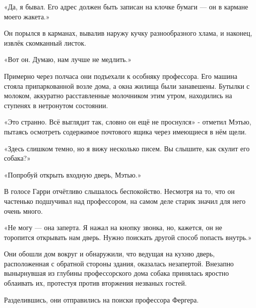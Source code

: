 \documentclass[a4paper,12pt]{book}
\begin{document}
\par
«Да, я бывал. Его адрес должен быть записан на клочке бумаги — он в кармане моего жакета.»
\par
Он порылся в карманах, вывалив наружу кучку разнообразного хлама, и наконец, извлёк скомканный листок.
\par
«Вот он. Думаю, нам лучше не медлить.»\\
\par	
Примерно через полчаса они подъехали к особняку профессора. Его машина стояла припаркованной возле дома, а окна жилища были занавешены. Бутылки с молоком, аккуратно расставленные молочником этим утром, находились на ступенях в нетронутом состоянии.
\par
«Это странно. Всё выглядит так, словно он ещё не проснулся» - отметил Мэтью, пытаясь осмотреть содержимое почтового ящика через имеющиеся в нём щели.
\par
«Здесь слишком темно, но я вижу несколько писем. Вы слышите, как скулит его собака?»
\par
«Попробуй открыть входную дверь, Мэтью.»
\par
В голосе Гарри отчётливо слышалось беспокойство. Несмотря на то, что он частенько подшучивал над профессором, на самом деле старик значил для него очень много.
\par
«Не могу — она заперта. Я нажал на кнопку звонка, но, кажется, он не торопится открывать нам дверь. Нужно поискать другой способ попасть внутрь.»
\par
Они обошли дом вокруг и обнаружили, что ведущая на кухню дверь, расположенная с обратной стороны здания, оказалась незапертой. Внезапно вынырнувшая из глубины профессорского дома собака принялась яростно облаивать их, протестуя против вторжения незваных гостей.
\par
Разделившись, они отправились на поиски профессора Фергера.
\end{document}
